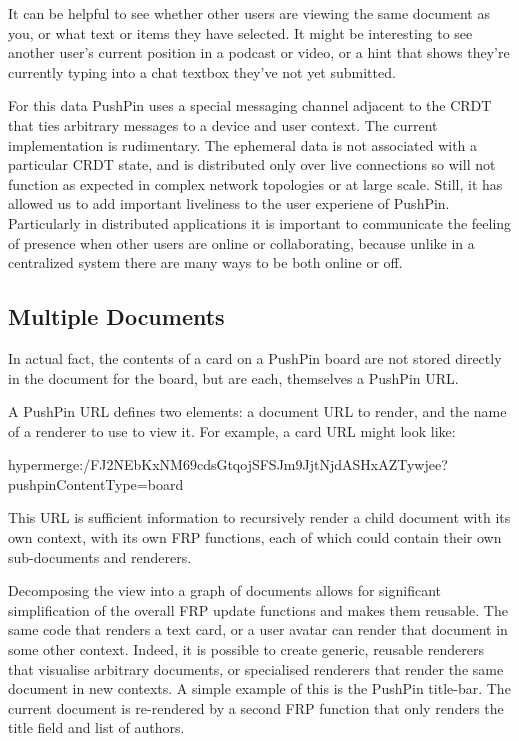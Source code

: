 \documentclass[sigplan,10pt]{acmart}
\begin{document}
It can be helpful to see whether other users are viewing the same document as you, or what text or items they have selected. It might be interesting to see another user's current position in a podcast or video, or a hint that shows they're currently typing into a chat textbox they've not yet submitted.

For this data PushPin uses a special messaging channel adjacent to the CRDT that ties arbitrary messages to a device and user context. The current implementation is rudimentary. The ephemeral data is not associated with a particular CRDT state, and is distributed only over live connections so will not function as expected in complex network topologies or at large scale. Still, it has allowed us to add important liveliness to the user experiene of PushPin. Particularly in distributed applications it is important to communicate the feeling of presence when other users are online or collaborating, because unlike in a centralized system there are many ways to be both online or off.

\subsection{Multiple Documents}
In actual fact, the contents of a card on a PushPin board are not stored directly in the document for the board, but are each, themselves a PushPin URL. 

A PushPin URL defines two elements: a document URL to render, and the name of a renderer to use to view it. For example, a card URL might look like:

\begin{code}
hypermerge:/FJ2NEbKxNM69cdsGtqojSFSJm9JjtNjdASHxAZTywjee?pushpinContentType=board
\end{code}

This URL is sufficient information to recursively render a child document with its own context, with its own FRP functions, each of which could contain their own sub-documents and renderers.

Decomposing the view into a graph of documents allows for significant simplification of the overall FRP update functions and makes them reusable. The same code that renders a text card, or a user avatar can render that document in some other context. Indeed, it is possible to create generic, reusable renderers that visualise arbitrary documents, or specialised renderers that render the same document in new contexts. A simple example of this is the PushPin title-bar. The current document is re-rendered by a second FRP function that only renders the title field and list of authors. 
\end{document}
